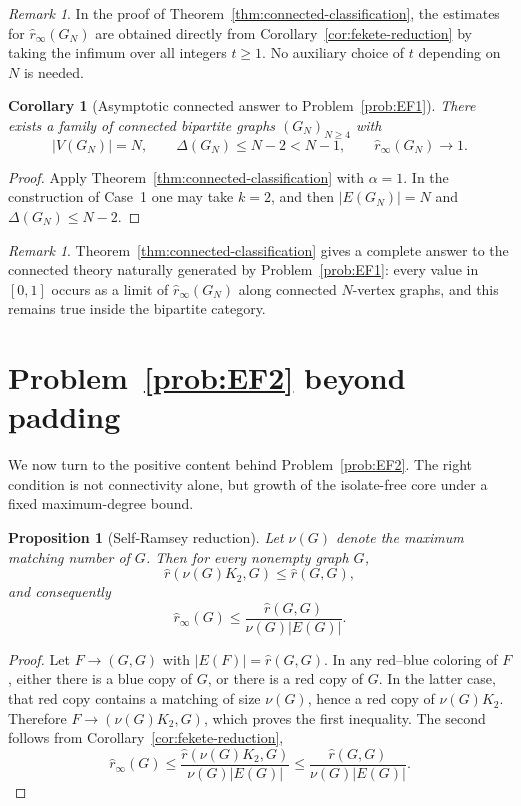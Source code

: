 \documentclass[11pt]{article}
\newcommand{\sr}{\hat r}
\newcommand{\sri}{\hat r_{\infty}}
\newtheorem{proposition}[theorem]{Proposition}
\newtheorem{corollary}[theorem]{Corollary}
\theoremstyle{definition}
\theoremstyle{remark}
\newtheorem{remark}[theorem]{Remark}
\newcounter{case}
\begin{document}
\begin{remark}\label{rem:tN-choice}
In the proof of Theorem~\ref{thm:connected-classification}, the estimates for $\sri(G_N)$
are obtained directly from Corollary~\ref{cor:fekete-reduction} by taking the infimum over
all integers $t\ge 1$. No auxiliary choice of $t$ depending on $N$ is needed.
\end{remark}

\begin{corollary}[Asymptotic connected answer to Problem~\ref{prob:EF1}]
\label{cor:connected-one}
There exists a family of connected bipartite graphs $(G_N)_{N\ge 4}$ with
\[
|V(G_N)|=N,
\qquad
\Delta(G_N) \leq N-2<N-1,
\qquad
\sri(G_N)\to 1.
\]
\end{corollary}

\begin{proof}
Apply Theorem~\ref{thm:connected-classification} with $\alpha=1$. In the construction of
Case~1 one may take $k=2$, and then
$|E(G_N)|=N$ and 
$\Delta(G_N) \leq N-2.$
\end{proof}

\begin{remark}
Theorem~\ref{thm:connected-classification} gives a complete answer to the connected theory
naturally generated by Problem~\ref{prob:EF1}: every value in $[0,1]$ occurs as a limit of
$\sri(G_N)$ along connected $N$-vertex graphs, and this remains true inside the bipartite
category.
\end{remark}

\section{Problem~\ref{prob:EF2} beyond padding}

We now turn to the positive content behind Problem~\ref{prob:EF2}. The right condition is
not connectivity alone, but growth of the isolate-free core under a fixed maximum-degree
bound.

\begin{proposition}[Self-Ramsey reduction]\label{prop:self-ramsey}
Let $\nu(G)$ denote the maximum matching number of $G$. Then for every nonempty graph $G$,
\[
\sr(\nu(G)K_2,G)\le \sr(G,G),
\]
and consequently
\[
\sri(G)\le \frac{\sr(G,G)}{\nu(G)|E(G)|}.
\]
\end{proposition}

\begin{proof}
Let $F\to(G,G)$ with $|E(F)|=\sr(G,G)$. In any red--blue coloring of $F$, either there is a
blue copy of $G$, or there is a red copy of $G$. In the latter case, that red copy contains a
matching of size $\nu(G)$, hence a red copy of $\nu(G)K_2$. Therefore
$F\to(\nu(G)K_2,G)$,
which proves the first inequality. The second follows from
Corollary~\ref{cor:fekete-reduction},
\[
\sri(G)
\le \frac{\sr(\nu(G)K_2,G)}{\nu(G)|E(G)|}
\le \frac{\sr(G,G)}{\nu(G)|E(G)|}.
\]
\end{proof}
\end{document}
